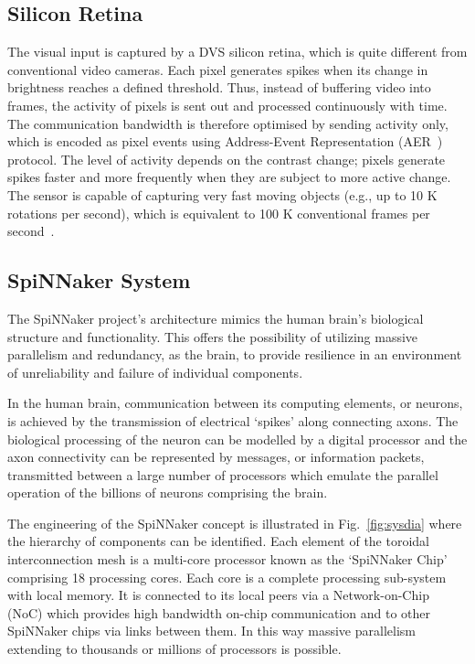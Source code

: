 \subsection{Silicon Retina}
The visual input is captured by a DVS silicon retina, which is quite different from conventional video cameras.
Each pixel generates spikes when its change in brightness reaches a defined threshold.
Thus, instead of buffering video into frames, the activity of pixels is sent out and processed continuously with time.
The communication bandwidth is therefore optimised by sending activity only, which is encoded as pixel events using Address-Event Representation (AER~\cite{lazzaro1995multi}) protocol.
The level of activity depends on the contrast change; pixels generate spikes faster and more frequently when they are subject to more active change.
The sensor is capable of capturing very fast moving objects (e.g., up to 10 K rotations per second), which is equivalent to 100 K conventional frames per second~\cite{lenero20113}.

\subsection{SpiNNaker System}
The SpiNNaker project's architecture mimics the human brain's biological structure and functionality. 
This offers the possibility of utilizing massive parallelism and redundancy, as the brain, to provide resilience in an environment of unreliability and failure of individual components.

In the human brain, communication between its computing elements, or neurons, is achieved by the transmission of electrical `spikes' along connecting axons. 
The biological processing of the neuron can be modelled by a digital processor and the axon connectivity can be represented by messages, or information packets, transmitted between a large number of processors which emulate the parallel operation of the billions of neurons comprising the brain.

The engineering of the SpiNNaker concept is illustrated in Fig.~\ref{fig:sysdia} where the hierarchy of components can be identified. 
Each element of the toroidal interconnection mesh is a multi-core processor known as the `SpiNNaker Chip' comprising 18 processing cores. 
Each core is a complete processing sub-system with local memory.
It is connected to its local peers via a Network-on-Chip (NoC) which provides high bandwidth on-chip communication and to other SpiNNaker chips via links between them. 
In this way massive parallelism extending to thousands or millions of processors is possible.

